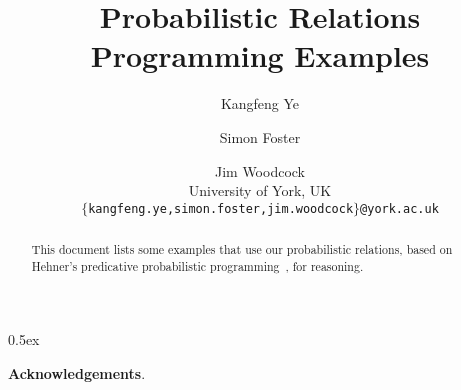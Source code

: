 \documentclass[11pt,a4paper]{article}
\begin{document}
\title{Probabilistic Relations Programming Examples}

\author{Kangfeng Ye \and Simon Foster \and Jim Woodcock \\[.5ex] University of York, UK \\[2ex] \texttt{\small $\{$kangfeng.ye,simon.foster,jim.woodcock$\}$@york.ac.uk}}

\maketitle

\begin{abstract}
  This document lists some examples that use our probabilistic relations, based on Hehner's predicative probabilistic programming~\cite{Hehner2011}, for reasoning.
\end{abstract}

\tableofcontents

\parindent 0pt\parskip 0.5ex







\vspace{4ex}
\noindent\textbf{Acknowledgements}. 

\appendix

\vspace{4ex}

\pagebreak 


\end{document}
